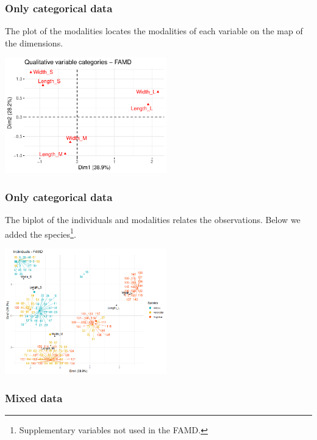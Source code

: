 \begin{frame}
\frametitle{Only categorical data}
The plot of the modalities locates the modalities of each variable on the map of the dimensions.
\begin{center}
\includegraphics[width=7cm]{../../Graphs/FAMD_quali.png}
\end{center}
\end{frame}
\begin{frame}
\frametitle{Only categorical data}
The biplot of the individuals and modalities relates the observations. Below we added the species\footnote{Supplementary variables not used in the FAMD.}.
\begin{center}
\includegraphics[width=7cm]{../../Graphs/FAMD_biplot_species.png}
\end{center}
\end{frame}
\begin{frame}
\frametitle{Mixed data}

\end{frame}
